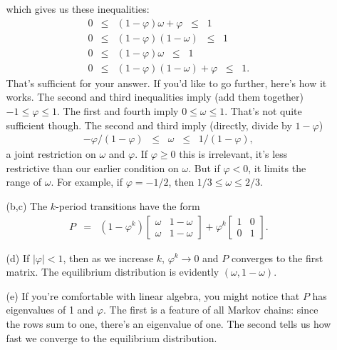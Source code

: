 \documentclass[11pt]{article}
\begin{document}
\begin{enumerate}
\begin{enumerate}
which gives us these inequalities:
\begin{eqnarray*}
    0 &\leq& (1-\varphi) \omega + \varphi \;\;\leq\;\; 1 \\
    0 &\leq& (1-\varphi) (1-\omega) \;\;\leq\;\; 1 \\
    0 &\leq& (1-\varphi) \omega \;\;\leq\;\; 1 \\
    0 &\leq& (1-\varphi) (1-\omega) + \varphi \;\;\leq\;\; 1 .
\end{eqnarray*}
That's sufficient for your answer.
If you'd like to go further, here's how it works.
The second and third inequalities imply (add them together)
$ - 1 \leq \varphi \leq 1 $.
The first and fourth imply $ 0 \leq \omega \leq 1$.
That's not quite sufficient though.
The second and third imply (directly, divide by $1-\varphi$)
\begin{eqnarray*}
        - \varphi /(1-\varphi) \;\;\leq\;\; \omega \;\;\leq\;\; 1/(1-\varphi),
\end{eqnarray*}
a joint restriction on $\omega$ and $\varphi$.
If $\varphi \geq 0$ this is irrelevant,
it's less restrictive than our earlier condition on $\omega$.
But if $\varphi < 0$, it limits the range of $\omega$.
For example, if $\varphi = -1/2$,
then $ 1/3 \leq \omega \leq 2/3$.

\item [(b,c)] The $k$-period transitions have the form
\begin{eqnarray*}
    P &=& (1-\varphi^k)
        \left[
        \begin{array}{cc}
        \omega & 1-\omega \\ \omega & 1-\omega
        \end{array}
        \right]
        + \varphi^k
        \left[
        \begin{array}{cc}
        1  & 0  \\  0  & 1
        \end{array}
        \right] .
\end{eqnarray*}

\item [(d)]
If $ | \varphi | < 1$,
then as we increase $k$, $\varphi^k \rightarrow 0$ and $P$ converges to the
first matrix.
The equilibrium distribution is evidently $(\omega, 1-\omega)$.

\item [(e)]
If you're comfortable with linear algebra, you might notice that
$P$ has eigenvalues of 1 and $\varphi$.
The first is a feature of all Markov chains:
since the rows sum to one, there's an eigenvalue of one.
The second tells us how fast we converge to the equilibrium
distribution.
\end{enumerate}


\end{enumerate}
\end{document}
